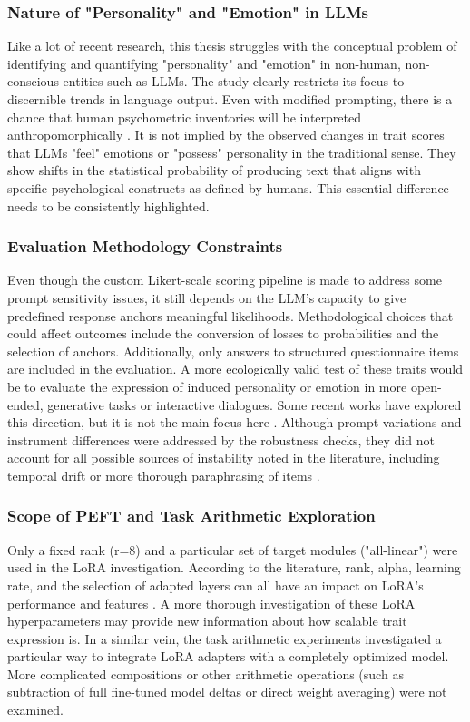 \documentclass{DESSThesis}
\begin{document}
\subsubsection{Nature of "Personality" and "Emotion" in LLMs}
Like a lot of recent research, this thesis struggles with the conceptual problem of identifying and quantifying "personality" and "emotion" in non-human, non-conscious entities such as LLMs. The study clearly restricts its focus to discernible trends in language output. Even with modified prompting, there is a chance that human psychometric inventories will be interpreted anthropomorphically \cite{suhr_challenging_2023, gupta_self-assessment_2024}. It is not implied by the observed changes in trait scores that LLMs "feel" emotions or "possess" personality in the traditional sense. They show shifts in the statistical probability of producing text that aligns with specific psychological constructs as defined by humans. This essential difference needs to be consistently highlighted.

\subsubsection{Evaluation Methodology Constraints}
Even though the custom Likert-scale scoring pipeline is made to address some prompt sensitivity issues, it still depends on the LLM's capacity to give predefined response anchors meaningful likelihoods. Methodological choices that could affect outcomes include the conversion of losses to probabilities and the selection of anchors. Additionally, only answers to structured questionnaire items are included in the evaluation. A more ecologically valid test of these traits would be to evaluate the expression of induced personality or emotion in more open-ended, generative tasks or interactive dialogues. Some recent works have explored this direction, but it is not the main focus here \cite{jiang_personallm_2024, zhang_sentient_2025}. Although prompt variations and instrument differences were addressed by the robustness checks, they did not account for all possible sources of instability noted in the literature, including temporal drift or more thorough paraphrasing of items \cite{shu_you_2024, bodroza_personality_2024}.

\subsubsection{Scope of PEFT and Task Arithmetic Exploration}
Only a fixed rank (r=8) and a particular set of target modules ("all-linear") were used in the LoRA investigation. According to the literature, rank, alpha, learning rate, and the selection of adapted layers can all have an impact on LoRA's performance and features \cite{biderman_lora_2024, hayou_lora_2024, hu_llm-adapters_2023}. A more thorough investigation of these LoRA hyperparameters may provide new information about how scalable trait expression is. In a similar vein, the task arithmetic experiments investigated a particular way to integrate LoRA adapters with a completely optimized model. More complicated compositions or other arithmetic operations (such as subtraction of full fine-tuned model deltas or direct weight averaging) were not examined.
\end{document}
